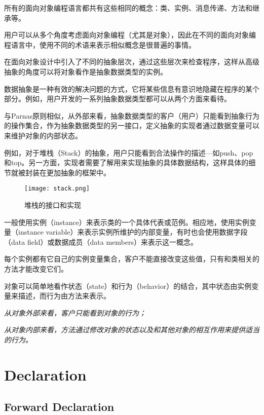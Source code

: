 所有的面向对象编程语言都共有这些相同的概念：类、实例、消息传递、方法和继承等。


用户可以从多个角度考虑面向对象编程（尤其是对象），因此在不同的面向对象编程语言中，使用不同的术语来表示相似概念是很普遍的事情。

在面向对象设计中引入了不同的抽象层次，通过这些层次来检查程序，这样从高级抽象的角度可以将对象看作是抽象数据类型的实例。

数据抽象是一种有效的解决问题的方式，它将某些信息有意识地隐藏在程序的某个部分。例如，用户开发的一系列抽象数据类型都可以从两个方面来看待。

与Parnas原则相似，从外部来看，抽象数据类型的客户（用户）只能看到抽象行为的操作集合，作为抽象数据类型的另一接口，定义抽象的实现者通过数据变量可以来维护对象的内部状态。

例如，对于堆栈（Stack）的抽象，用户只能看到合法操作的描述—如push、pop和top。另一方面，实现者需要了解用来实现抽象的具体数据结构，这样具体的细节就被封装在更加抽象的框架中。

\begin{figure}[htbp]
\centering
\texttt{[image: stack.png]}
\caption{堆栈的接口和实现}
\label{fig:stack}
\end{figure}

一般使用实例（instance）来表示类的一个具体代表或范例。相应地，使用实例变量（instance variable）来表示实例所维护的内部变量，有时也会使用数据字段（data field）或数据成员（data members）来表示这一概念。

每个实例都有它自己的实例变量集合，客户不能直接改变这些值，只有和类相关的方法才能改变它们。

对象可以简单地看作状态（state）和行为（behavior）的结合，其中状态由实例变量来描述，而行为由方法来表示。

\begin{compactitem}
\item \textsl{从对象外部来看，客户只能看到对象的行为；}
\item \textsl{从对象内部来看，方法通过修改对象的状态以及和其他对象的相互作用来提供适当的行为。}
\end{compactitem}

\chapter{Declaration}


\section{Forward Declaration}


